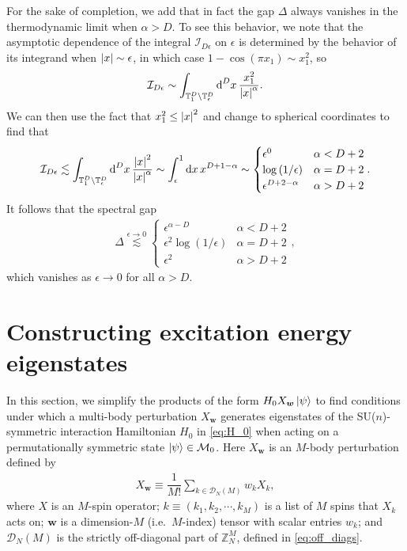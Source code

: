 \documentclass[nofootinbib,notitlepage,11pt]{revtex4-2}
\newcommand{\f}[2]{\dfrac{#1}{#2}} %
\newcommand{\p}[1]{\left(#1\right)} %
\newcommand{\m}{\bm} %
\newcommand{\1}{\mathds{1}}
\renewcommand{\d}{\text{d}}
\newcommand{\D}{\mathcal{D}}
\newcommand{\I}{\mathcal{I}}
\newcommand{\M}{\mathcal{M}}
\newcommand{\TT}{\mathbb{T}}
\newcommand{\ZZ}{\mathbb{Z}}
\begin{document}
For the sake of completion, we add that in fact the gap $\Delta$
always vanishes in the thermodynamic limit when $\alpha>D$.  To see
this behavior, we note that the asymptotic dependence of the integral
$\I_{D\epsilon}$ on $\epsilon$ is determined by the behavior of its
integrand when $\abs{x}\sim\epsilon$, in which case
$1-\cos\p{\pi x_1}\sim x_1^2$, so
\begin{align}
  \I_{D\epsilon}
  \sim \int_{\TT_1^D\setminus\TT_\epsilon^D} \d^Dx\,
  \f{x_1^2}{\abs{x}^\alpha}.
\end{align}
We can then use the fact that $x_1^2\le\abs{x}^2$ and change to
spherical coordinates to find that
\begin{align}
  \I_{D\epsilon} \lesssim
  \int_{\TT_1^D\setminus\TT_\epsilon^D} \d^Dx\,
  \f{\abs{x}^2}{\abs{x}^\alpha}
  \sim \int_\epsilon^1 \d x\, x^{D+1-\alpha}
  \sim
  \begin{cases}
    \epsilon^0 & \alpha < D+2 \\
    \log\p{1/\epsilon} & \alpha = D+2 \\
    \epsilon^{D+2-\alpha} & \alpha > D+2
  \end{cases}.
\end{align}
It follows that the spectral gap
\begin{align}
  \Delta \stackrel{\epsilon\to0}{\lesssim}
  \begin{cases}
    \epsilon^{\alpha-D} & \alpha < D+2 \\
    \epsilon^2 \log\p{1/\epsilon} & \alpha = D + 2 \\
    \epsilon^2 & \alpha > D+2
  \end{cases},
\end{align}
which vanishes as $\epsilon\to0$ for all $\alpha>D$.

\section{Constructing excitation energy eigenstates}
\label{sec:eigenstates}

In this section, we simplify the products of the form
$H_0X_{\m w}\ket\psi$ to find conditions under which a multi-body
perturbation $X_{\m w}$ generates eigenstates of the SU($n$)-symmetric
interaction Hamiltonian $H_0$ in \eqref{eq:H_0} when acting on a
permutationally symmetric state $\ket\psi\in\M_0$.  Here $X_{\m w}$ is
an $M$-body perturbation defined by
\begin{align}
  X_{\m w}
  \equiv \f1{M!} \sum_{k\in\D_N\p{M}} w_k X_k,
\end{align}
where $X$ is an $M$-spin operator; $k\equiv\p{k_1,k_2,\cdots,k_M}$ is
a list of $M$ spins that $X_k$ acts on; $\m w$ is a dimension-$M$
(i.e.~$M$-index) tensor with scalar entries $w_k$; and $\D_N\p{M}$ is
the strictly off-diagonal part of $\ZZ_N^M$, defined in
\eqref{eq:off_diags}.
\end{document}
